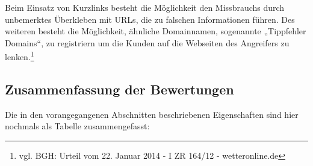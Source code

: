 Beim Einsatz von Kurzlinks besteht die Möglichkeit den Missbrauchs durch unbemerktes Überkleben mit \ac{URL}s, die zu falschen Informationen führen. Des weiteren besteht die Möglichkeit, ähnliche Domainnamen, sogenannte „Tippfehler Domains“, zu registriern um die Kunden auf die Webseiten des Angreifers zu lenken.\footnote{vgl. BGH: Urteil vom 22. Januar 2014 - I ZR 164/12 - wetteronline.de}

\subsection{Zusammenfassung der Bewertungen} %
\label{sub:zusammenfassung_der_bewertungen}

Die in den vorangegangenen Abschnitten beschriebenen Eigenschaften sind hier nochmals als Tabelle zusammengefasst:

